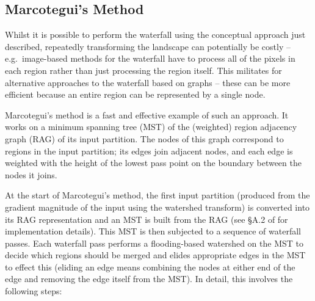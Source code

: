\documentclass[preprint,a4paper]{elsarticle}
\begin{document}
\subsection{Marcotegui's Method}

Whilst it is possible to perform the waterfall using the conceptual approach just described, repeatedly transforming the landscape can potentially be costly -- e.g.~image-based methods for the waterfall have to process all of the pixels in each region rather than just processing the region itself. This militates for alternative approaches to the waterfall based on graphs -- these can be more efficient because an entire region can be represented by a single node.

Marcotegui's method \cite{marcotegui05} is a fast and effective example of such an approach. It works on a minimum spanning tree (MST) of the (weighted) region adjacency graph (RAG) of its input partition\footnotemark{}. The nodes of this graph correspond to regions in the input partition; its edges join adjacent nodes, and each edge is weighted with the height of the lowest pass point on the boundary between the nodes it joins.


At the start of Marcotegui's method, the first input partition (produced from the gradient magnitude of the input using the watershed transform) is converted into its RAG representation and an MST is built from the RAG (see \S{}A.2 of \cite{golodetz11} for implementation details). This MST is then subjected to a sequence of waterfall passes. Each waterfall pass performs a flooding-based watershed on the MST to decide which regions should be merged and elides appropriate edges in the MST to effect this (eliding an edge means combining the nodes at either end of the edge and removing the edge itself from the MST). In detail, this involves the following steps:
\end{document}
